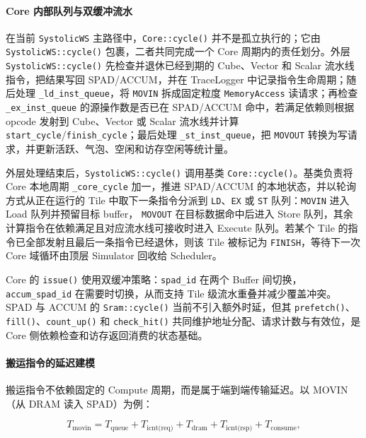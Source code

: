 \documentclass{CjC}
\begin{document}
    \paragraph{Core 内部队列与双缓冲流水}
    在当前 \texttt{SystolicWS} 主路径中，\texttt{Core::cycle()} 并不是孤立执行的；它由
    \texttt{SystolicWS::cycle()} 包裹，二者共同完成一个 Core 周期内的责任划分。外层
    \texttt{SystolicWS::cycle()} 先检查并退休已经到期的 Cube、Vector 和 Scalar 流水线指令，把结果写回
    SPAD/ACCUM，并在 TraceLogger 中记录指令生命周期；随后处理 \texttt{\_ld\_inst\_queue}，将
    \texttt{MOVIN} 拆成固定粒度 \texttt{MemoryAccess} 读请求；再检查
    \texttt{\_ex\_inst\_queue} 的源操作数是否已在 SPAD/ACCUM 命中，若满足依赖则根据 opcode 发射到 Cube、Vector 或 Scalar 流水线并计算
    \texttt{start\_cycle}/\texttt{finish\_cycle}；最后处理 \texttt{\_st\_inst\_queue}，把
    \texttt{MOVOUT} 转换为写请求，并更新活跃、气泡、空闲和访存空闲等统计量。

    外层处理结束后，\texttt{SystolicWS::cycle()} 调用基类 \texttt{Core::cycle()}。基类负责将 Core 本地周期
    \texttt{\_core\_cycle} 加一，推进 SPAD/ACCUM 的本地状态，并以轮询方式从正在运行的 Tile 中取下一条指令分派到
    \texttt{LD}、\texttt{EX} 或 \texttt{ST} 队列：\texttt{MOVIN} 进入 Load 队列并预留目标 buffer，
    \texttt{MOVOUT} 在目标数据命中后进入 Store 队列，其余计算指令在依赖满足且对应流水线可接收时进入 Execute 队列。若某个 Tile 的指令已全部发射且最后一条指令已经退休，则该 Tile 被标记为
    \texttt{FINISH}，等待下一次 Core 域循环由顶层 Simulator 回收给 Scheduler。

    Core 的 \texttt{issue()} 使用双缓冲策略：\texttt{spad\_id} 在两个 Buffer 间切换，\texttt{accum\_spad\_id}
    在需要时切换，从而支持 Tile 级流水重叠并减少覆盖冲突。SPAD 与 ACCUM 的 \texttt{Sram::cycle()} 当前不引入额外时延，但其
    \texttt{prefetch()}、\texttt{fill()}、\texttt{count\_up()} 和 \texttt{check\_hit()} 共同维护地址分配、请求计数与有效位，是 Core 侧依赖检查和访存返回消费的状态基础。

    \paragraph{搬运指令的延迟建模}
    搬运指令不依赖固定的 Compute 周期，而是属于端到端传输延迟。以 MOVIN（从 DRAM
    读入 SPAD）为例：

    \begin{equation}
        T_{\text{movin}}= T_{\text{queue}}+ T_{\text{icnt(req)}}+ T_{\text{dram}}
        + T_{\text{icnt(rsp)}}+ T_{\text{consume}},
    \end{equation}
\end{document}
